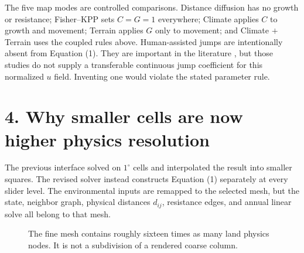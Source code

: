 \documentclass[10pt]{article}
\begin{document}
The five map modes are controlled comparisons.  Distance diffusion has no growth or resistance; Fisher--KPP sets $C=G=1$ everywhere; Climate applies $C$ to growth and movement; Terrain applies $G$ only to movement; and Climate $+$ Terrain uses the coupled rules above.  Human-assisted jumps are intentionally absent from Equation (1).  They are important in the literature \citep{ladin2023,belouard2025}, but those studies do not supply a transferable continuous jump coefficient for this normalized $u$ field.  Inventing one would violate the stated parameter rule.

\section*{4. Why smaller cells are now higher physics resolution}
The previous interface solved on $1^\circ$ cells and interpolated the result into smaller squares.  The revised solver instead constructs Equation (1) separately at every slider level.  The environmental inputs are remapped to the selected mesh, but the state, neighbor graph, physical distances $d_{ij}$, resistance edges, and annual linear solve all belong to that mesh.

\begin{figure}[h]
\centering
{}
\caption{The fine mesh contains roughly sixteen times as many land physics nodes.  It is not a subdivision of a rendered coarse column.}
\label{fig:resolution}
\end{figure}
\end{document}
